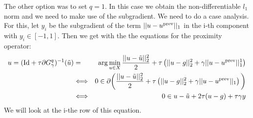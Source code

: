         The other option was to set $q = 1$. In this case we obtain the non-differentiable $l_{1}$ norm and we need to make use of the subgradient. We need to do a case analysis. For this, let $y_{i}$ be the subgradient of the term $||u - u^{\textnormal{prev}}||_{1}$ in the i-th component with $y_{i} \in [-1, 1]$. Then we get with the the equations for the proximity operator:
            \begin{eqnarray}
                u = (\textnormal{Id} + \tau \partial G^{q}_{\gamma})^{-1}(\tilde{u}) &=& \arg \min_{u \in X} \frac{||u - \tilde{u}||_{2}^{2}}{2} + \tau \left( ||u - g||_{2}^{2} + \gamma ||u - u^{\textnormal{prev}}||_{1}^{1} \right) \notag \\
                &\Longleftrightarrow& 0 \in \partial \bigg( \frac{||u - \tilde{u}||_{2}^{2}}{2} + \tau \left( ||u - g||_{2}^{2} + \gamma ||u - u^{\textnormal{prev}}||_{1} \right) \bigg)\notag \\
                &\Longleftrightarrow& 0 \in u - \tilde{u} + 2\tau (u - g) + \tau\gamma y \notag
            \end{eqnarray}
        We will look at the i-the row of this equation.
